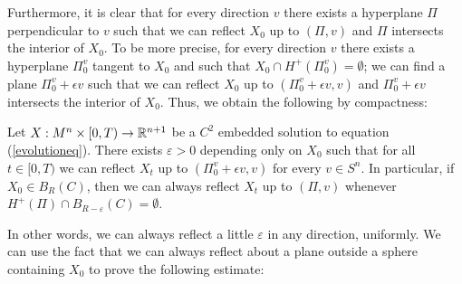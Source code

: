  Furthermore, it is clear that for every direction $v$ there exists a hyperplane $\Pi$ perpendicular to $v$ such that we can reflect $X_0$ up to $(\Pi, v)$ and $\Pi$ intersects the interior of $X_0$. To be more precise, for every direction $v$ there exists a hyperplane $\Pi_0^v$ tangent to $X_0$ and such that $X_0\cap H^+(\Pi_0^v)=\emptyset$; we can find a plane $\Pi_0^v +\epsilon v$ such that we can reflect $X_0$ up to $(\Pi_0^v +\epsilon v, v)$ and $\Pi_0^v +\epsilon v$ intersects the interior of $X_0$. Thus, we obtain the following by compactness:


\begin{cor}
	Let $X:M^n\times [0,T) \rightarrow \mathbb{R}^{n+1}$ be a $C^2$ embedded solution to equation (\ref{evolutioneq}). There exists $\varepsilon>0$ depending only on $X_0$ such that for all $t\in[0, T)$ we can reflect $X_t$ up to $(\Pi_0^v +\epsilon v, v)$ for every $v \in S^n$. In particular, if $X_0 \in B_R (C)$, then we can always reflect $X_t$ up to $(\Pi, v)$ whenever $H^+(\Pi)\cap B_{R-\varepsilon}(C)=\emptyset$.\label{reflect a small bit}
\end{cor}
In other words, we can always reflect a little $\varepsilon$ in any direction, uniformly. We can use the fact that we can always reflect about a plane outside a sphere containing $X_0$ to prove the following estimate:




